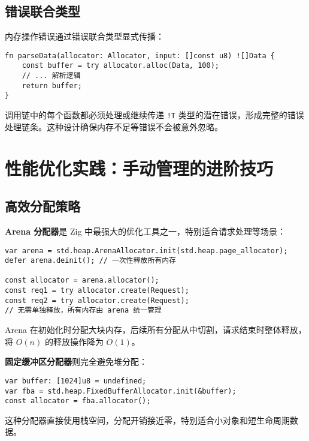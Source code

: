 \section{错误联合类型}
内存操作错误通过错误联合类型显式传播：\par
\begin{lstlisting}[language=zig]
fn parseData(allocator: Allocator, input: []const u8) ![]Data {
    const buffer = try allocator.alloc(Data, 100);
    // ... 解析逻辑
    return buffer;
}
\end{lstlisting}
调用链中的每个函数都必须处理或继续传递 \texttt{!T} 类型的潜在错误，形成完整的错误处理链条。这种设计确保内存不足等错误不会被意外忽略。\par
\chapter{性能优化实践：手动管理的进阶技巧}
\section{高效分配策略}
\textbf{Arena 分配器}是 Zig 中最强大的优化工具之一，特别适合请求处理等场景：\par
\begin{lstlisting}[language=zig]
var arena = std.heap.ArenaAllocator.init(std.heap.page_allocator);
defer arena.deinit(); // 一次性释放所有内存

const allocator = arena.allocator();
const req1 = try allocator.create(Request);
const req2 = try allocator.create(Request);
// 无需单独释放，所有内存由 arena 统一管理
\end{lstlisting}
Arena 在初始化时分配大块内存，后续所有分配从中切割，请求结束时整体释放，将 $O(n)$ 的释放操作降为 $O(1)$。\par
\textbf{固定缓冲区分配器}则完全避免堆分配：\par
\begin{lstlisting}[language=zig]
var buffer: [1024]u8 = undefined;
var fba = std.heap.FixedBufferAllocator.init(&buffer);
const allocator = fba.allocator();
\end{lstlisting}
这种分配器直接使用栈空间，分配开销接近零，特别适合小对象和短生命周期数据。\par
